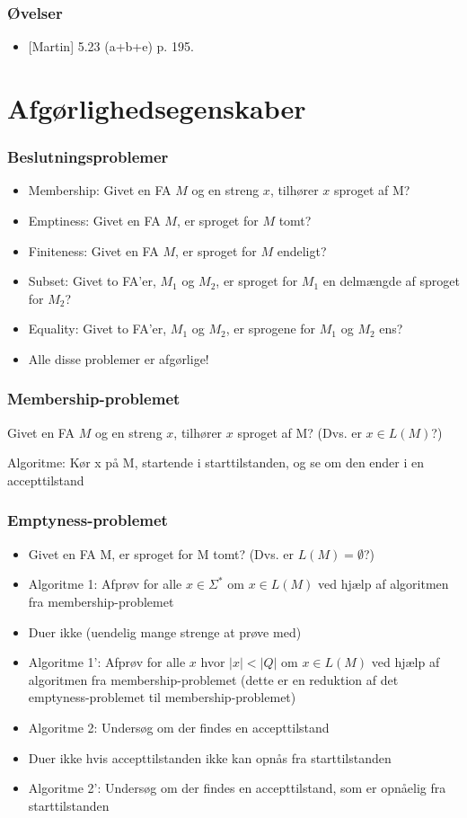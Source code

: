 \begin{frame}
\frametitle{Øvelser}
\begin{itemize}
\item{} [Martin] 5.23 (a+b+e) p. 195.
\end{itemize}
\end{frame}
\section{Afgørlighedsegenskaber}

\begin{frame}
\frametitle{Beslutningsproblemer}
\begin{itemize}[<+->]
\item  Membership: Givet en FA $M$ og en streng $x$, tilhører $x$  
    sproget af M? 
\item  Emptiness:  Givet en FA $M$, er sproget for $M$ tomt? 
\item  Finiteness:  Givet en FA $M$, er sproget for $M$ endeligt? 
\item  Subset:  Givet to FA’er, $M_1$ og $M_2$, er sproget for $M_1$ en  
       delmængde af sproget for $M_2$? 
\item  Equality:  Givet to FA’er, $M_1$ og $M_2$, er sprogene for $M_1$  
                og $M_2$ ens? 
\item  Alle disse problemer er afgørlige!
\end{itemize}
\end{frame}

\begin{frame}
\frametitle{Membership-problemet}
Givet en FA $M$ og en streng $x$, tilhører $x$ sproget af M? 
(Dvs. er $x\in L(M)$?)
\pause

Algoritme: 
Kør x på M, startende i starttilstanden, og se om den  
ender i en accepttilstand
\end{frame}

\begin{frame}
\frametitle{Emptyness-problemet}
\begin{itemize}[<+->]
\item Givet en FA M, er sproget for M tomt? 
(Dvs. er $L(M)=\emptyset$?) 
\item Algoritme 1:
  Afprøv for alle $x\in \Sigma^*$ om $x\in L(M)$ ved hjælp af  
  algoritmen fra membership-problemet
\item Duer ikke (uendelig mange strenge at prøve med)
\item
  Algoritme 1': Afprøv for alle $x$ hvor $|x|<|Q|$ om $x\in L(M)$ ved
  hjælp af algoritmen fra membership-problemet (dette er en reduktion
  af det emptyness-problemet til membership-problemet)
\item
  Algoritme 2: 
  Undersøg om der findes en accepttilstand
\item Duer ikke hvis accepttilstanden ikke kan opnås fra starttilstanden
\item
  Algoritme 2': 
  Undersøg om der findes en accepttilstand, som er  
  opnåelig fra starttilstanden

\end{itemize}
\end{frame}

